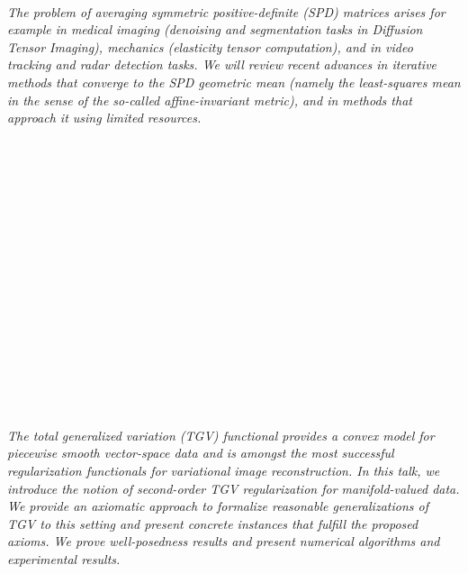\begin{multicols}{2}
\\
      \textit{The problem of averaging symmetric positive-definite (SPD) matrices arises for example in medical imaging (denoising and segmentation tasks in Diffusion Tensor Imaging), mechanics (elasticity tensor computation), and in video tracking and radar detection tasks. We will review recent advances in iterative methods that converge to the SPD geometric mean (namely the least-squares mean in the sense of the so-called affine-invariant metric), and in methods that approach it using limited resources.}\\
\\ 
        \\
        \\\\
        \\
        \\\\
        \\
        \\\\
        \\
        \\\\
        \\
        \\\\
\\
      \textit{The total generalized variation (TGV) functional provides a convex model for piecewise smooth vector-space data and is amongst the most successful regularization functionals for variational image reconstruction. In this talk, we introduce the notion of second-order TGV regularization for manifold-valued data. We provide an axiomatic approach to formalize reasonable generalizations of TGV to this setting and present concrete instances that fulfill the proposed axioms. We prove well-posedness results and present numerical algorithms and experimental results.}\\
\\ 
        \\
        \\\\
        \\

\end{multicols}
